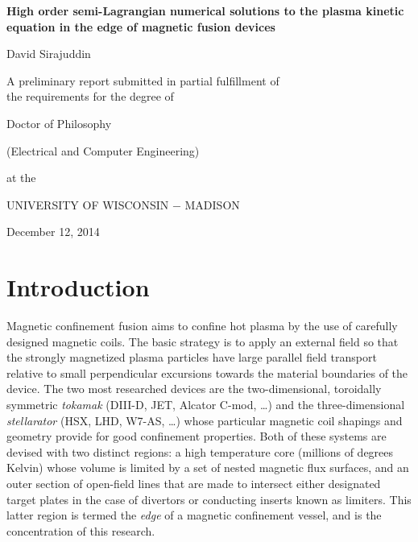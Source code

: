 \documentclass[11pt,titlepage]{report}
\begin{document}
\begin{titlepage}
\begin{center}

\vspace*{1 in}

\textbf{High order semi-Lagrangian numerical solutions to the plasma kinetic equation in the edge of magnetic fusion devices}

\vspace{1 in}

David Sirajuddin

\vspace{0.5 in}

A preliminary report submitted in partial fulfillment of\\
the requirements for the degree of

\vspace{0.5 in}

Doctor of Philosophy

\vspace{0.25 in}

(Electrical and Computer Engineering)

\vspace{0.5 in}

at the

\vspace{0.5 in}

UNIVERSITY OF WISCONSIN $-$ MADISON

\vspace{0.5 in}

December 12, 2014

\end{center}
\end{titlepage}

\setcounter{page}{1}
\setlength{\parindent}{1cm}
\tableofcontents
\pagebreak
\listoffigures
\listoftables
\pagebreak


\chapter{Introduction}\label{chap:Introduction}


\indent \indent Magnetic confinement fusion aims to confine hot plasma by the use of carefully designed magnetic coils. The basic strategy is to apply an external field so that the strongly magnetized plasma particles have large parallel field transport relative to small perpendicular excursions towards the material boundaries of the device. The two most researched devices are the two-dimensional, toroidally symmetric \emph{tokamak} (DIII-D, JET, Alcator C-mod, \ldots ) and the three-dimensional \emph{stellarator} (HSX, LHD, W7-AS, \ldots ) whose particular magnetic coil shapings and geometry provide for good confinement properties. Both of these systems are devised with two distinct regions: a high temperature core (millions of degrees Kelvin) whose volume is limited by a set of nested magnetic flux surfaces, and an outer section of open-field lines that are made to intersect either designated target plates in the case of divertors or conducting inserts known as limiters. This latter region is termed the \emph{edge} of a magnetic confinement vessel, and is the concentration of this research.
\end{document}
